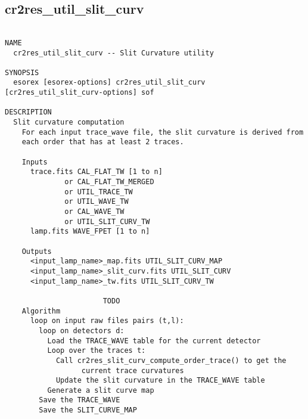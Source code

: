 \subsection{cr2res\_util\_slit\_curv}
\begin{verbatim}

NAME
  cr2res_util_slit_curv -- Slit Curvature utility

SYNOPSIS
  esorex [esorex-options] cr2res_util_slit_curv [cr2res_util_slit_curv-options] sof

DESCRIPTION
  Slit curvature computation                                              
    For each input trace_wave file, the slit curvature is derived from    
    each order that has at least 2 traces.                                
                                                                          
    Inputs                                                                
      trace.fits CAL_FLAT_TW [1 to n]                  
              or CAL_FLAT_TW_MERGED                    
              or UTIL_TRACE_TW                         
              or UTIL_WAVE_TW                          
              or CAL_WAVE_TW                           
              or UTIL_SLIT_CURV_TW                     
      lamp.fits WAVE_FPET [1 to n]                         
                                                                          
    Outputs                                                               
      <input_lamp_name>_map.fits UTIL_SLIT_CURV_MAP     
      <input_lamp_name>_slit_curv.fits UTIL_SLIT_CURV  
      <input_lamp_name>_tw.fits UTIL_SLIT_CURV_TW       
                                                                          
                       TODO
    Algorithm                                                             
      loop on input raw files pairs (t,l):                                
        loop on detectors d:                                              
          Load the TRACE_WAVE table for the current detector              
          Loop over the traces t:                                         
            Call cr2res_slit_curv_compute_order_trace() to get the        
                  current trace curvatures                                
            Update the slit curvature in the TRACE_WAVE table             
          Generate a slit curve map                                       
        Save the TRACE_WAVE                                               
        Save the SLIT_CURVE_MAP                                           
                                                                          

\end{verbatim}
